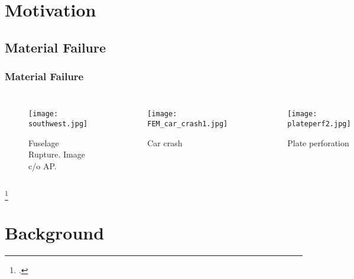 %
%
\section{Motivation}
%
\subsection*{Material Failure}
%
\begin{frame}
  \frametitle{Material Failure}
  
     \begin{columns}[T] %

     \vspace{-0.5cm}
     \begin{figure}
        \centering
        \texttt{[image: southwest.jpg]}
        \caption{Fuselage Rupture. Image c/o AP.}
     \end{figure}
     \vspace{-0.5cm}
     \begin{figure}
        \centering
        \texttt{[image: FEM\_car\_crash1.jpg]}
        \caption{Car crash}
     \end{figure}

       
     \begin{figure}
       \centering
       \texttt{[image: plateperf2.jpg]}
       \caption{Plate perforation}
     \end{figure}
     \end{columns}
     
     \footcite{borvik1999ballistic}
  
\end{frame}
%
\section{Background}
%
%
